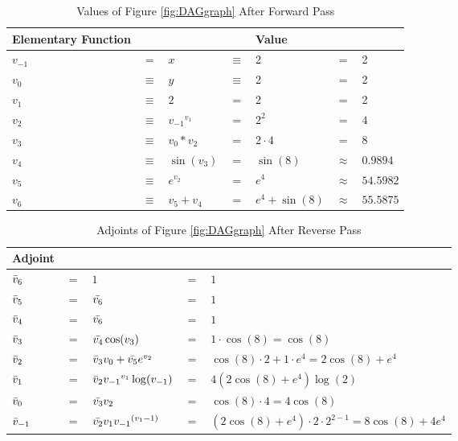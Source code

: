 \documentclass{article}
\begin{document}
\begin{table}[h!]
    \centering
    \begin{tabular}{|lclllcl|}
        \hline
        Elementary Function & & & & Value & &\\
        \hline
        $v_{-1}$ & $=$ & $x$ & $\equiv$ & 2 & $=$ & 2\\
        $v_{0}$ & $\equiv$ & $y$ & $\equiv$ & 2 & $=$ & 2\\
        \hline
        $v_{1}$ & $\equiv$ & $2$ & $=$ & 2 & $=$ & 2\\
        $v_{2}$ & $\equiv$ & ${v_{-1}}^{v_{1}}$ & $=$ & $ 2^2$ & $=$ & $4$\\
        $v_{3}$ & $\equiv$ & $v_0 * v_2$ & $=$ & $ 2 \cdot 4$ & $=$ & $8$\\
        $v_{4}$ & $\equiv$ & $\sin(v_3)$ & $=$ & $\sin(8)$ & $\approx$ & $0.9894$\\
        $v_{5}$ & $\equiv$ & $e^{v_2}$ & $=$ & $ e^4$ & $\approx$ & $54.5982$\\
        \hline
        $v_{6}$ & $\equiv$ & $v_5 + v_4$ & $=$ & $e^4 + \sin(8)$ & $\approx$ & $55.5875$\\
        \hline
    \end{tabular}
    \caption{Values of Figure \ref{fig:DAGgraph} After Forward Pass}
    \label{tab:rmexample1FP}
\end{table}

\begin{table}[h!]
    \centering
    \begin{tabular}{|lclll|}
        \hline
        Adjoint & & & & \\
        \hline
        $\Bar{v}_{6}$ & $=$ & $1$ & $=$ & $1$ \\
        \hline
        $\Bar{v}_{5}$ & $=$ & $\Bar{v_6}$ & $=$ & $1$\\
        $\Bar{v}_{4}$ & $=$ & $\Bar{v_6}$ & $=$ & $1$\\
        $\Bar{v}_{3}$ & $=$ & $\Bar{v_4}\cos(v_3)$ & $=$ & $1 \cdot \cos(8) = \cos(8)$ \\
        $\Bar{v}_{2}$ & $=$ & $\Bar{v}_{3}v_0 + \Bar{v_5}e^{v_2}$ & $=$ & $\cos(8) \cdot 2 + 1 \cdot e^{4} = 2\cos(8)+e^4$ \\
        $\Bar{v}_{1}$ & $=$ & $\Bar{v}_{2}{v_{-1}}^{v_{1}}\log(v_{-1})$ & $=$ & $4(2\cos(8)+e^4)\log(2)$ \\
        \hline
        $\Bar{v}_{0}$ & $=$ & $\Bar{v_3}v_2$ & $=$ & $\cos(8)\cdot4 = 4\cos(8)$ \\
        $\Bar{v}_{-1}$ & $=$ & $\Bar{v_2}v_1 {v_{-1}}^{(v_{1}-1)}$ & $=$ & $(2\cos(8)+e^4) \cdot 2 \cdot 2^{2-1} = 8\cos(8)+4e^4$ \\
        \hline   
    \end{tabular}
    \caption{Adjoints of Figure \ref{fig:DAGgraph} After Reverse Pass}
    \label{tab:rmexample1RP}
\end{table}
\end{document}
